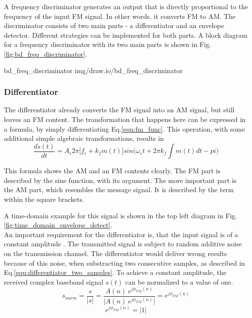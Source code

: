 A frequency discriminator generates an output that is directly proportional to the frequency of the input FM signal.
In other words, it converts FM to AM.
The discriminator consists of two main parts - a differentiator and an envelope detector.
Different strategies can be implemented for both parts.
A block diagram for a frequency discriminator with its two main parts is shown in Fig.\ref{fig:bd_freq_discriminator}.

 {bd_freq_discriminator} {img/draw.io/bd_freq_discriminator}

\subsubsection{Differentiator}

The differentiator already converts the FM signal into an AM signal, but still leaves an FM content.
The transformation that happens here can be expressed in a formula, by simply differentiating Eq.\eqref{equ:fm_func}.
This operation, with some additional simple algebraic transformations, results in
\begin{equation}
  \frac{d s(t)}{dt} = A_c 2 \pi \Big[f_c + k_f m(t) \Big] sin \Big(\omega_c t + 2 \pi k_f \int m(t) dt -pi \Big)
  \label{equ:fm_demod_discriminator}
\end{equation}

This formula shows the AM and an FM contents clearly.
The FM part is described by the sine function, with its argument.
The more important part is the AM part, which resembles the message signal.
It is described by the term within the square brackets.

A time-domain example for this signal is shown in the top left diagram in Fig.\ref{fig:time_domain_envelope_detect}.\\

An important requirement for the differentiator is, that the input signal is of a constant amplitude \cite{SchnyderHaller2002}.
The transmitted signal is subject to random additive noise on the transmission channel.
The differentiator would deliver wrong results because of this noise, when substracting two consecutive samples, as described in Eq.\eqref{equ:differentiator_two_samples}.
To achieve a constant amplitude, the received complex baseband signal $s(t)$ can be normalized to a value of one.
\begin{equation}
  s_{norm} = \frac{s}{|s|} = \frac{A(n)\ e^{j\phi_{FM}(n)}}{|{A(n)\ e^{j\phi_{FM}(n)}|}} = e^{j\phi_{FM}(n)}
\end{equation}
\begin{equation}
  e^{j\phi_{FM}(n)} = |1|
\end{equation}

